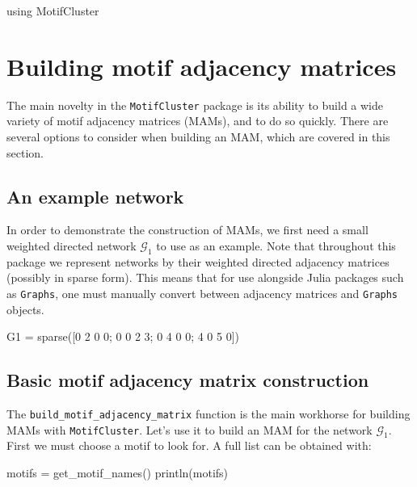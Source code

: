 \documentclass{article}
\begin{document}
\begin{tcolorbox}[colback=black!5!white,colframe=black!15!white]
\begin{juliablock}
using MotifCluster
\end{juliablock}
\end{tcolorbox}



\section{Building motif adjacency matrices}

The main novelty in the \texttt{MotifCluster} package is its ability to
build a wide variety of motif adjacency matrices (MAMs), and to do so quickly.
There are several options to consider when building an MAM,
which are covered in this section.

\subsection{An example network}

In order to demonstrate the construction of MAMs,
we first need a small weighted directed network
$\mathcal{G}_1$ to use as an example.
Note that throughout this package we represent networks by their
weighted directed adjacency matrices (possibly in sparse form).
This means that for use alongside Julia packages such as \texttt{Graphs},
one must manually convert between adjacency matrices and
\texttt{Graphs} objects.

\begin{tcolorbox}[colback=black!5!white,colframe=black!15!white]
\begin{juliablock}
G1 = sparse([0 2 0 0; 0 0 2 3; 0 4 0 0; 4 0 5 0])
\end{juliablock}
\end{tcolorbox}

\subsection{Basic motif adjacency matrix construction}

The \texttt{build\_motif\_adjacency\_matrix} function is the main workhorse
for building MAMs with \texttt{MotifCluster}.
Let's use it to build an MAM for the network $\mathcal{G}_1$.
First we must choose a motif to look for.
A full list can be obtained with:

\begin{tcolorbox}[colback=black!5!white,colframe=black!15!white]
\begin{juliablock}
motifs = get_motif_names()
println(motifs)
\end{juliablock}
\texttt{\obeylines\printpythontex}
\end{tcolorbox}
\end{document}
